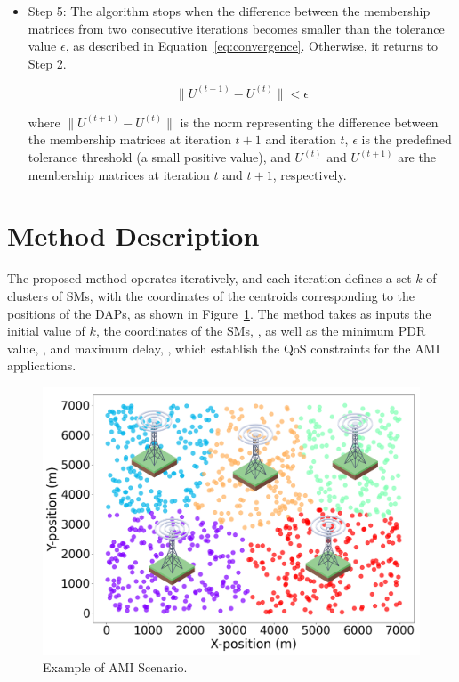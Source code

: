 \documentclass[a4paper,fleqn]{cas-dc}
\begin{document}
\begin{itemize}
    \item Step 5: The algorithm stops when the difference between the membership matrices from two consecutive iterations becomes smaller than the tolerance value \(\epsilon\), as described in Equation~\ref{eq:convergence}. Otherwise, it returns to Step 2.

    \begin{equation} \label{eq:convergence}
        \lVert U^{(t+1)} - U^{(t)} \rVert < \epsilon
    \end{equation}

    where \(\lVert U^{(t+1)} - U^{(t)} \rVert\) is the norm representing the difference between the membership matrices at iteration \(t+1\) and iteration \(t\), \(\epsilon\) is the predefined tolerance threshold (a small positive value), and \(U^{(t)}\) and \(U^{(t+1)}\) are the membership matrices at iteration \(t\) and \(t+1\), respectively.
\end{itemize}

\section{Method Description} \label{sec:method}

The proposed method operates iteratively, and each iteration defines a set \(k\) of clusters of \gls{SMs}, with the coordinates of the centroids corresponding to the positions of the \gls{DAPs}, as shown in Figure~\ref{fig:scenario}. The method takes as inputs the initial value of \(k\), the coordinates of the SMs, , as well as the minimum PDR value, , and maximum delay, , which establish the \gls{QoS} constraints for the \gls{AMI} applications.

\begin{figure}[ht]
    \centering
    \includegraphics[width=0.98\linewidth]{imgs/5gws.png}
    \caption{Example of AMI Scenario.}
    \label{fig:scenario}
\end{figure}
\end{document}

